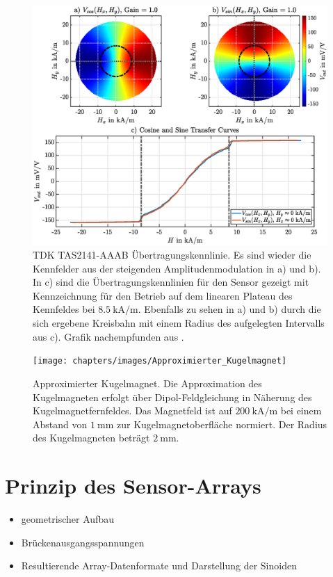	\clearpage
	\begin{figure}[tbph]
		\centering
		\includegraphics[width=\linewidth]{chapters/images/TDK_Uebertragungskennlinien}
		\caption[TDK TAS2141-AAAB Übertragungskennlinie]{TDK TAS2141-AAAB Übertragungskennlinie. Es sind wieder die 
		Kennfelder aus der steigenden Amplitudenmodulation in a) und b). In c) sind die Übertragungskennlinien für den 
		Sensor gezeigt mit Kennzeichnung für den Betrieb auf dem linearen Plateau des Kennfeldes bei 
		$\SI{8.5}{\kilo\ampere\per\metre}$. Ebenfalls zu sehen in a) und b) durch die sich ergebene Kreisbahn mit einem 
		Radius des aufgelegten Intervalls aus c). Grafik nachempfunden aus \cite{Schuethe2019}.}
		\label{fig:TDKuebertragungskennlinien}
	\end{figure}

	

	
	\clearpage
	\begin{figure}[tbph]
		\centering
		\texttt{[image: chapters/images/Approximierter\_Kugelmagnet]}
		\caption[Approximierter Kugelmagnet]{Approximierter Kugelmagnet. Die Approximation des Kugelmagneten erfolgt 
		über Dipol-Feldgleichung in Näherung des Kugelmagnetfernfeldes. Das Magnetfeld ist auf 
		$\SI{200}{\kilo\ampere\per\metre}$ bei einem Abstand von $\SI{1}{\milli\metre}$ zur Kugelmagnetoberfläche 
		normiert. Der Radius des Kugelmagneten beträgt $\SI{2}{\milli\metre}$.}
		\label{fig:dipolemagnet}
	\end{figure}
	
	
	\clearpage
	
	
\section{Prinzip des Sensor-Arrays}\label{sec:prinzip-des-sensor-arrays}
	\begin{itemize}
		\item geometrischer Aufbau
		\item Brückenausgangsspannungen
		\item Resultierende Array-Datenformate und Darstellung der Sinoiden
	\end{itemize}


